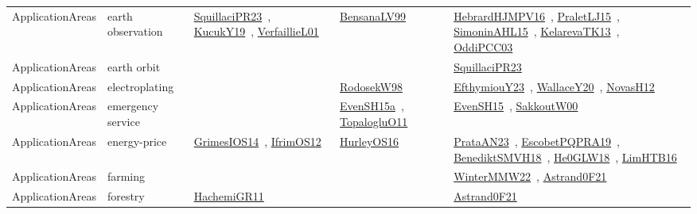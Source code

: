 {\begin{longtable}{lp{3cm}>{\raggedright\arraybackslash}p{6cm}>{\raggedright\arraybackslash}p{6cm}>{\raggedright\arraybackslash}p{8cm}}
ApplicationAreas & earth observation & \href{works/SquillaciPR23.pdf}{SquillaciPR23}~\cite{SquillaciPR23}, \href{works/KucukY19.pdf}{KucukY19}~\cite{KucukY19}, \href{works/VerfaillieL01.pdf}{VerfaillieL01}~\cite{VerfaillieL01} & \href{works/BensanaLV99.pdf}{BensanaLV99}~\cite{BensanaLV99} & \href{works/HebrardHJMPV16.pdf}{HebrardHJMPV16}~\cite{HebrardHJMPV16}, \href{works/PraletLJ15.pdf}{PraletLJ15}~\cite{PraletLJ15}, \href{works/SimoninAHL15.pdf}{SimoninAHL15}~\cite{SimoninAHL15}, \href{works/KelarevaTK13.pdf}{KelarevaTK13}~\cite{KelarevaTK13}, \href{works/OddiPCC03.pdf}{OddiPCC03}~\cite{OddiPCC03}\\
ApplicationAreas & earth orbit &  &  & \href{works/SquillaciPR23.pdf}{SquillaciPR23}~\cite{SquillaciPR23}\\
ApplicationAreas & electroplating &  & \href{works/RodosekW98.pdf}{RodosekW98}~\cite{RodosekW98} & \href{works/EfthymiouY23.pdf}{EfthymiouY23}~\cite{EfthymiouY23}, \href{works/WallaceY20.pdf}{WallaceY20}~\cite{WallaceY20}, \href{works/NovasH12.pdf}{NovasH12}~\cite{NovasH12}\\
ApplicationAreas & emergency service &  & \href{works/EvenSH15a.pdf}{EvenSH15a}~\cite{EvenSH15a}, \href{works/TopalogluO11.pdf}{TopalogluO11}~\cite{TopalogluO11} & \href{works/EvenSH15.pdf}{EvenSH15}~\cite{EvenSH15}, \href{works/SakkoutW00.pdf}{SakkoutW00}~\cite{SakkoutW00}\\
ApplicationAreas & energy-price & \href{works/GrimesIOS14.pdf}{GrimesIOS14}~\cite{GrimesIOS14}, \href{works/IfrimOS12.pdf}{IfrimOS12}~\cite{IfrimOS12} & \href{works/HurleyOS16.pdf}{HurleyOS16}~\cite{HurleyOS16} & \href{works/PrataAN23.pdf}{PrataAN23}~\cite{PrataAN23}, \href{works/EscobetPQPRA19.pdf}{EscobetPQPRA19}~\cite{EscobetPQPRA19}, \href{works/BenediktSMVH18.pdf}{BenediktSMVH18}~\cite{BenediktSMVH18}, \href{works/He0GLW18.pdf}{He0GLW18}~\cite{He0GLW18}, \href{works/LimHTB16.pdf}{LimHTB16}~\cite{LimHTB16}\\
ApplicationAreas & farming &  &  & \href{works/WinterMMW22.pdf}{WinterMMW22}~\cite{WinterMMW22}, \href{works/Astrand0F21.pdf}{Astrand0F21}~\cite{Astrand0F21}\\
ApplicationAreas & forestry & \href{works/HachemiGR11.pdf}{HachemiGR11}~\cite{HachemiGR11} &  & \href{works/Astrand0F21.pdf}{Astrand0F21}~\cite{Astrand0F21}\\

\end{longtable}}
